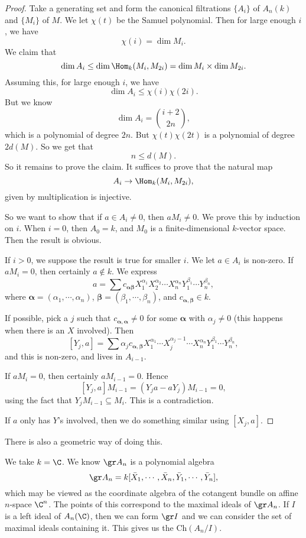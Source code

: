 \documentclass[a4paper]{article}
\begin{document}
\begin{proof}
  Take a generating set and form the canonical filtrations $\{A_i\}$ of $A_n(k)$ and $\{M_i\}$ of $M$. We let $\chi(t)$ be the Samuel polynomial. Then for large enough $i$, we have
  \[
    \chi(i) = \dim M_i.
  \]
  We claim that
  \[
    \dim A_i \leq \dim \Hom_k(M_i, M_{2i}) = \dim M_i \times \dim M_{2i}.
  \]
  Assuming this, for large enough $i$, we have
  \[
    \dim A_i \leq \chi(i) \chi(2i).
  \]
  But we know
  \[
    \dim A_i = \binom{i + 2}{2n},
  \]
  which is a polynomial of degree $2n$. But $\chi(t) \chi(2t)$ is a polynomial of degree $2 d(M)$. So we get that
  \[
    n \leq d(M).
  \]
  So it remains to prove the claim. It suffices to prove that the natural map
  \[
    A_i \to \Hom_k (M_i, M_{2i}),
  \]
  given by multiplication is injective.

  So we want to show that if $a \in A_i \not= 0$, then $a M_i \not= 0$. We prove this by induction on $i$. When $i = 0$, then $A_0 = k$, and $M_0$ is a finite-dimensional $k$-vector space. Then the result is obvious.

  If $i > 0$, we suppose the result is true for smaller $i$. We let $a \in A_i$ is non-zero. If $a M_i = 0$, then certainly $a \not\in k$. We express
  \[
    a = \sum c_{\boldsymbol\alpha\boldsymbol\beta} X_1^{\alpha_1} X_2^{\alpha_2} \cdots X_n^{\alpha_n} Y_1^{\beta_1} \cdots Y_n^{\beta_n},
  \]
  where $\boldsymbol\alpha = (\alpha_1, \cdots, \alpha_n)$, $\boldsymbol\beta = (\beta_1, \cdots, \beta_n)$, and $c_{\boldsymbol\alpha, \boldsymbol\beta} \in k$.

  If possible, pick a $j$ such that $c_{\boldsymbol\alpha, \boldsymbol\alpha} \not= 0$ for some $\boldsymbol\alpha$ with $\alpha_j \not= 0$ (this happens when there is an $X$ involved). Then
  \[
    [Y_j, a] = \sum \alpha_j c_{\boldsymbol\alpha, \boldsymbol\beta} X_1^{\alpha_1} \cdots X_j^{\alpha_j - 1} \cdots X_n^{\alpha_n} Y_1^{\beta_1} \cdots Y_n^{\beta_n},
  \]
  and this is non-zero, and lives in $A_{i - 1}$.

  If $a M_i = 0$, then certainly $a M_{i - 1} = 0$. Hence
  \[
    [Y_j, a] M_{i - 1} = (Y_j a - a Y_j) M_{i - 1} = 0,
  \]
  using the fact that $Y_j M_{i - 1} \subseteq M_i$. This is a contradiction.

  If $a$ only has $Y$'s involved, then we do something similar using $[X_j, a]$.
\end{proof}
There is also a geometric way of doing this.

We take $k = \C$. We know $\gr A_n$ is a polynomial algebra
\[
  \gr A_n = k[\bar{X}_1, \cdots, \bar{X}_n, \bar{Y}_1, \cdots, \bar{Y}_n],
\]
which may be viewed as the coordinate algebra of the cotangent bundle on affine $n$-space $\C^n$. The points of this correspond to the maximal ideals of $\gr A_n$. If $I$ is a left ideal of $A_n(\C)$, then we can form $\gr I$ and we can consider the set of maximal ideals containing it. This gives us the  $\mathrm{Ch}(A_n/I)$.
\end{document}
